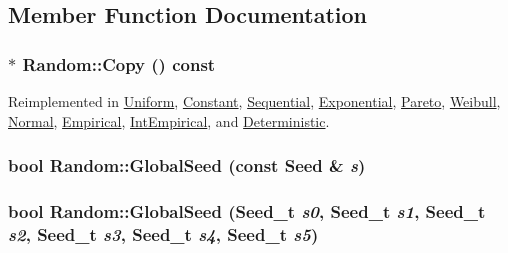 \subsection{Member Function Documentation}
\hypertarget{classRandom_22b2951acd2008e8ff58fae434ab7ac5}{
\subsubsection[{Copy}]{ $\ast$ Random::Copy () const}}
\label{classRandom_22b2951acd2008e8ff58fae434ab7ac5}




Reimplemented in \hyperlink{classUniform_11e73242faca88963143bdb3d296a48b}{Uniform}, \hyperlink{classConstant_47fc42d1d87bddf581084ae6b495ab2f}{Constant}, \hyperlink{classSequential_8a26193ea7fa5a8d7266c9a963028fe1}{Sequential}, \hyperlink{classExponential_f7c51eb8cb4fee14f659a55f994e981f}{Exponential}, \hyperlink{classPareto_ec16a6e0b598846a9af58037ea5417d4}{Pareto}, \hyperlink{classWeibull_2a82af828e7ba08035de1d326f714afa}{Weibull}, \hyperlink{classNormal_e59f996a159efc4b26c6e373f672b050}{Normal}, \hyperlink{classEmpirical_d5429fdf863d53d74649cc8c630cfb0b}{Empirical}, \hyperlink{classIntEmpirical_d7e809689f9158c050b8a386eb945636}{IntEmpirical}, and \hyperlink{classDeterministic_4eb4260ecbc55661f1d9c268e6684ea4}{Deterministic}.\hypertarget{classRandom_5ad9a6dc6be2a2a6c0dd8451fa51b10c}{
\subsubsection[{GlobalSeed}]{\setlength{\rightskip}{0pt plus 5cm}bool Random::GlobalSeed (const {\bf Seed} \& {\em s})}}
\label{classRandom_5ad9a6dc6be2a2a6c0dd8451fa51b10c}


\hypertarget{classRandom_1e80a206ef4c02260fb488cf02990d55}{
\subsubsection[{GlobalSeed}]{\setlength{\rightskip}{0pt plus 5cm}bool Random::GlobalSeed ({\bf Seed\_\-t} {\em s0}, \/  {\bf Seed\_\-t} {\em s1}, \/  {\bf Seed\_\-t} {\em s2}, \/  {\bf Seed\_\-t} {\em s3}, \/  {\bf Seed\_\-t} {\em s4}, \/  {\bf Seed\_\-t} {\em s5})}}
\label{classRandom_1e80a206ef4c02260fb488cf02990d55}


